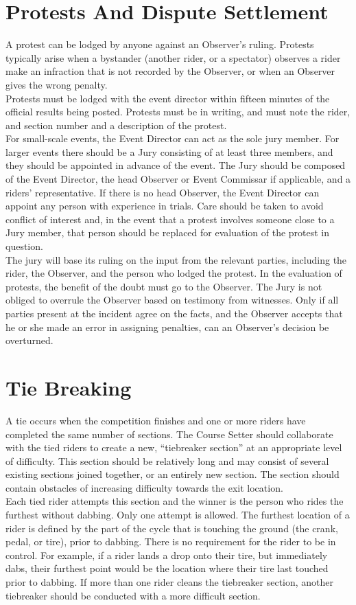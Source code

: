 \section{Protests And Dispute Settlement}
A protest can be lodged by anyone against an Observer's ruling. Protests typically arise when a bystander (another rider, or
a spectator) observes a rider make an infraction that is not recorded by the Observer, or when an Observer gives the wrong
penalty.\\
Protests must be lodged with the event director within fifteen minutes of the official results being posted. Protests must be
in writing, and must note the rider, and section number and a description of the protest.\\
For small-scale events, the Event Director can act as the sole jury member. For larger events there should be a Jury
consisting of at least three members, and they should be appointed in advance of the event. The Jury should be composed
of the Event Director, the head Observer or Event Commissar if applicable, and a riders' representative. If there is no head
Observer, the Event Director can appoint any person with experience in trials. Care should be taken to avoid conflict of
interest and, in the event that a protest involves someone close to a Jury member, that person should be replaced for
evaluation of the protest in question. \\
The jury will base its ruling on the input from the relevant parties, including the rider, the Observer, and the person who
lodged the protest. In the evaluation of protests, the benefit of the doubt must go to the Observer. The Jury is not obliged to
overrule the Observer based on testimony from witnesses. Only if all parties present at the incident agree on the facts, and
the Observer accepts that he or she made an error in assigning penalties, can an Observer's decision be overturned.
\section{Tie Breaking}
A tie occurs when the competition finishes and one or more riders have completed the same number of sections.
The Course Setter should collaborate with the tied riders to create a new, “tiebreaker section” at an appropriate level of
difficulty. This section should be relatively long and may consist of several existing sections joined together, or an entirely
new section. The section should contain obstacles of increasing difficulty towards the exit location.\\
Each tied rider attempts this section and the winner is the person who rides the furthest without dabbing. Only one attempt
is allowed. The furthest location of a rider is defined by the part of the cycle that is touching the ground (the crank, pedal,
or tire), prior to dabbing. There is no requirement for the rider to be in control. For example, if a rider lands a drop onto
their tire, but immediately dabs, their furthest point would be the location where their tire last touched prior to dabbing.
If more than one rider cleans the tiebreaker section, another tiebreaker should be conducted with a more difficult section.
